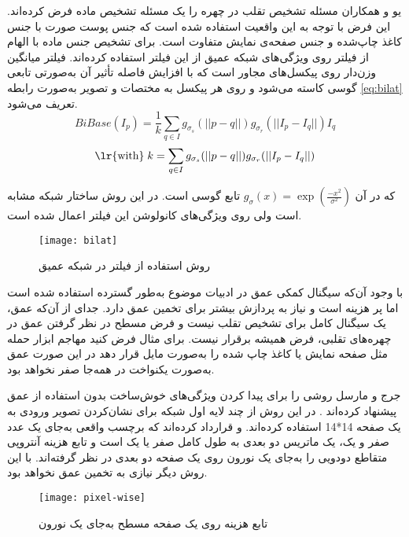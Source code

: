  یو و همکاران 
\cite{yu2020face}
 مسئله تشخیص تقلب در چهره را یک مسئله تشخیص ماده فرض کرده‌اند. این فرض با توجه به این واقعیت استفاده شده است که جنس پوست صورت با جنس کاغذ چاپ‌شده و جنس صفحه‌ی نمایش متفاوت است. برای تشخیص جنس ماده با الهام از فیلتر  روی ویژگی‌های شبکه عمیق از این فیلتر استفاده کرده‌اند. فیلتر  میانگین وزن‌دار روی پیکسل‌های مجاور است که با افزایش فاصله تأثیر آن به‌صورتی تابعی گوسی کاسته می‌شود و روی هر پیکسل به مختصات  و تصویر  به‌صورت رابطه 
\ref{eq:bilat}  
 تعریف می‌شود.
\begin{equation}\label{eq:bilat}
	BiBase(I_p)=\frac{1}{k}\sum_{q\in I}{g_{\sigma_s}(||p-q||)g_{\sigma_r}(||I_p-I_q||)I_q}
\end{equation}
\begin{equation}\label{eq:bilatk}
	\text{\lr{with}} \; k=\sum_{q\in I}{g_{\sigma_s}(||p-q||)g_{\sigma_r}(||I_p-I_q||)}
	\nonumber
\end{equation}

که در آن
$g_\sigma (x) = \exp(\frac{-x^2}{\sigma^2})$
تابع گوسی است. در این روش ساختار شبکه مشابه
\cite{liu2018learning}
 است ولی روی ویژگی‌های کانولوشن این فیلتر اعمال شده است.
 
\begin{figure}[t]
 	\centerline{\texttt{[image: bilat]}}
 	\caption{روش استفاده از فیلتر  در شبکه عمیق \cite{yu2020face} }
 	\label{fig:bilat}
\end{figure}

با وجود آن‌که سیگنال کمکی عمق در ادبیات موضوع به‌طور گسترده استفاده شده است اما پر هزینه است و نیاز به پردازش بیشتر برای تخمین عمق دارد. جدای از آن‌که عمق، یک سیگنال کامل برای تشخیص تقلب نیست و فرض مسطح در نظر گرفتن عمق در چهره‌های تقلبی، فرض همیشه برقرار نیست. برای مثال فرض کنید مهاجم ابزار حمله مثل صفحه نمایش یا کاغذ چاپ شده را به‌صورت مایل قرار دهد در این صورت عمق به‌صورت یکنواخت در همه‌جا صفر نخواهد بود.

 جرج و مارسل روشی را برای پیدا کردن ویژگی‌های خوش‌ساخت بدون استفاده از عمق پیشنهاد کرده‌اند
 \cite{george2019deep}.
 در این روش از چند لایه اول شبکه 
\cite{huang2017densely}
برای نشان‌کردن
 تصویر ورودی به یک صفحه 14*14 استفاده کرده‌اند. و قرارداد کرده‌اند که برچسب واقعی به‌جای یک عدد صفر و یک، یک ماتریس دو بعدی به طول کامل صفر یا یک است و تابع هزینه آنتروپی متقاطع دودویی را به‌جای یک نورون روی یک صفحه دو بعدی در نظر گرفته‌اند. با این روش دیگر نیازی به تخمین عمق نخواهد بود.
\begin{figure}[h]
	\centerline{\texttt{[image: pixel-wise]}}
	\caption{تابع هزینه  روی یک صفحه مسطح به‌جای یک نورون \cite{george2019deep} }
	\label{fig:pixel-wise}
\end{figure}
